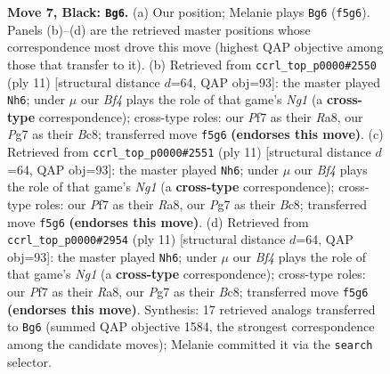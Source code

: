 \documentclass[11pt]{article}
\begin{document}
\begin{figure}[p]
\caption{\textbf{Move 7, Black: \texttt{Bg6}.} (a) Our position; Melanie plays \texttt{Bg6} (\texttt{f5g6}). Panels (b)--(d) are the retrieved master positions whose correspondence most drove this move (highest QAP objective among those that transfer to it). (b) Retrieved from \texttt{ccrl\_top\_p0000\#2550} (ply 11) [structural distance $d$=64, QAP obj=93]: the master played \texttt{Nh6}; under $\mu$ our \emph{Bf4} plays the role of that game's \emph{Ng1} (a \textbf{cross-type} correspondence); cross-type roles: our \emph{P}f7 as their \emph{R}a8, our \emph{P}g7 as their \emph{B}c8; transferred move \texttt{f5g6} \textbf{(endorses this move)}. (c) Retrieved from \texttt{ccrl\_top\_p0000\#2551} (ply 11) [structural distance $d$=64, QAP obj=93]: the master played \texttt{Nh6}; under $\mu$ our \emph{Bf4} plays the role of that game's \emph{Ng1} (a \textbf{cross-type} correspondence); cross-type roles: our \emph{P}f7 as their \emph{R}a8, our \emph{P}g7 as their \emph{B}c8; transferred move \texttt{f5g6} \textbf{(endorses this move)}. (d) Retrieved from \texttt{ccrl\_top\_p0000\#2954} (ply 11) [structural distance $d$=64, QAP obj=93]: the master played \texttt{Nh6}; under $\mu$ our \emph{Bf4} plays the role of that game's \emph{Ng1} (a \textbf{cross-type} correspondence); cross-type roles: our \emph{P}f7 as their \emph{R}a8, our \emph{P}g7 as their \emph{B}c8; transferred move \texttt{f5g6} \textbf{(endorses this move)}. Synthesis: 17 retrieved analogs transferred to \texttt{Bg6} (summed QAP objective 1584, the strongest correspondence among the candidate moves); Melanie committed it via the \texttt{search} selector.}
\label{fig:thought-m13}
\end{figure}

\clearpage
\end{document}

